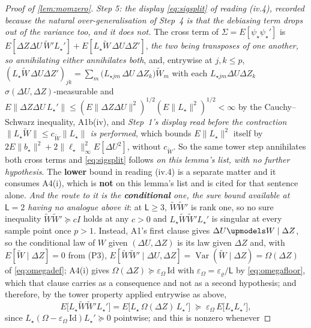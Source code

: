 \begin{proof}[Proof of \cref{lem:momzero}]
\emph{Step 5: the display \eqref{eq:sigsplit} of reading \textup{(iv.4)}, recorded because the natural
over-generalisation of Step~4 is that the debiasing term drops out of the variance too, and it does
not.} The cross term of $\Sigma=E[\psi_\star\psi_\star']$ is
$E[\Delta Z\Delta U\,\widetilde W'L_\star']+E[L_\star\widetilde W\,\Delta U\Delta Z']$, \emph{the two
being transposes of one another, so annihilating either annihilates both}, and, entrywise at
$j,k\le p$, $(L_\star\widetilde W\,\Delta U\Delta Z')_{jk}
=\sum_{m}\big(L_{\star jm}\,\Delta U\,\Delta Z_k\big)\widetilde W_m$ with each
$L_{\star jm}\Delta U\Delta Z_k$ $\sigma(\Delta U,\Delta Z)$-measurable and
$E\|\Delta Z\Delta U\,L_\star'\|\le(E\|\Delta Z\Delta U\|^{2})^{1/2}(E\|L_\star\|^{2})^{1/2}<\infty$ by the
Cauchy--Schwarz inequality, A1b(iv), and \emph{Step~1's display read before the contraction
$\|L_\star\widetilde W\|\le c_{\widetilde W}\|L_\star\|$ is performed}, which bounds $E\|L_\star\|^{2}$ itself by
$2E\|b_\star\|^{2}+2\|\ell_\star\|_\infty^{2}E[\Delta U^{2}]$, without $c_{\widetilde W}$. So the same
tower step annihilates both cross terms and
\eqref{eq:sigsplit} follows \emph{on this lemma's list, with no further hypothesis}. The
\textbf{lower} bound in reading \textup{(iv.4)} is a separate matter and it consumes A4(i), which is
\textbf{not} on this lemma's list and is cited for that sentence alone. \emph{And the route to it is the
\textbf{conditional} one, the sure bound available at $\mathsf L=2$ having no analogue above it}: at
$\mathsf L\ge3$, $\widetilde W\widetilde W'$ is rank one, so no sure inequality
$\widetilde W\widetilde W'\succeq cI$ holds at any $c>0$ and $L_\star\widetilde W\widetilde W'L_\star'$ is
singular at every sample point once $p>1$. Instead, A1's first clause gives
$\Delta U\upmodels W\mid\Delta Z$, so the conditional law of $W$ given $(\Delta U,\Delta Z)$ is its law
given $\Delta Z$ and, with $E[\widetilde W\mid\Delta Z]=0$ from (P3),
$E[\widetilde W\widetilde W'\mid\Delta U,\Delta Z]=\operatorname{Var}(\widetilde W\mid\Delta Z)=\Omega(\Delta Z)$
of \eqref{eq:omegadef}; A4(i) gives $\Omega(\Delta Z)\succeq\varepsilon_\Omega\,\mathrm{Id}$ with
$\varepsilon_\Omega=\varepsilon_\varrho/\mathsf L$ by \eqref{eq:omegafloor}, which that clause carries as a
consequence and not as a second hypothesis; and therefore, by the tower property applied entrywise as
above,
\[
E\big[L_\star\widetilde W\widetilde W'L_\star'\big]
=E\big[L_\star\,\Omega(\Delta Z)\,L_\star'\big]\;\succeq\;\varepsilon_\Omega\,E\big[L_\star L_\star'\big] ,
\]
since $L_\star(\Omega-\varepsilon_\Omega\,\mathrm{Id})L_\star'\succeq0$ pointwise; and this is nonzero whenever

\end{proof}
